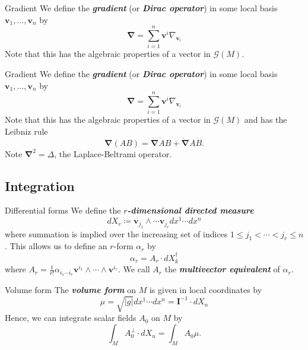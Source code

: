 \documentclass[aspectratio=169,handout]{beamer}
\newcommand\boldgreen[1]{\textcolor{lighter_csu_green}{\emph{\textbf{#1}}}}
\newcommand{\grad}{\boldsymbol{\nabla}}
\newcommand{\G}{\mathcal{G}}
\newcommand{\blade}[1]{\boldsymbol{#1}}
\newcommand{\pseudoscalar}{\blade{I}}
\begin{document}
\begin{frame}{Gradient}
\vfill
    We define the \boldgreen{gradient} (or \boldgreen{Dirac operator}) in some local basis $\blade{v}_1,\dots,\blade{v}_n$ by
    \[
    \grad = \sum_{i=1}^n \blade{v}^i \nabla_{\blade{v}_i}
    \]
    \pause
    Note that this has the algebraic properties of a vector in $\G(M)$.
\vfill
\end{frame}

\begin{frame}{Gradient}
\vfill
    We define the \boldgreen{gradient} (or \boldgreen{Dirac operator}) in some local basis $\blade{v}_1,\dots,\blade{v}_n$ by
    \[
    \grad = \sum_{i=1}^n \blade{v}^i \nabla_{\blade{v}_i}
    \]
    \pause
    Note that this has the algebraic properties of a vector in $\G(M)$ and has the Leibniz rule
    \[
    \grad(AB) = \dot{\grad}\dot{A}B + \dot{\grad}A\dot{B}.
    \]
    Note $\grad^2=\Delta$, the Laplace-Beltrami operator.
\vfill
\end{frame}



\subsection{Integration}

\begin{frame}{Differential forms}
\vfill
    We define the \boldgreen{$r$-dimensional directed measure}
    \[
    dX_r\coloneqq \blade{v}_{j_1} \wedge \cdots \blade{v}_{j_r} dx^1 \cdots dx^n
    \]
    where summation is implied over the increasing set of indices $1\leq j_1<\cdots<j_r\leq n$. This allows us to define an $r$-form $\alpha_r$ by
    \[
    \alpha_r = A_r \cdot dX_k^\dagger
    \]
    where $A_r = \frac{1}{r!} \alpha_{i_1 \cdots i_r} \blade{v}^{i_1} \wedge \cdots \wedge \blade{v}^{i_r}$. We call $A_r$ the \boldgreen{multivector equivalent} of $\alpha_r$.
\vfill
\end{frame}

\begin{frame}{Volume form}
\vfill
    The \boldgreen{volume form} on $M$ is given in local coordinates by 
    \[
    \mu = \sqrt{|g|}dx^1\cdots dx^n = \pseudoscalar^{-1} \cdot dX_n
    \]
    Hence, we can integrate scalar fields $A_0$ on $M$ by
    \[
    \int_M A_0^\perp \cdot dX_n =  \int_M A_0 \mu.
    \]
\vfill
\end{frame}
\end{document}
